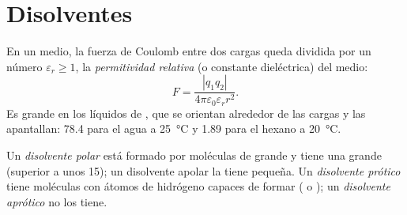 \section{Disolventes}

\begin{definition}\label{def:b1:intermolecular-forces-solvents:permittivity}
En un medio, la fuerza de Coulomb entre dos cargas queda dividida por un
número $\varepsilon_r \ge 1$, la \emph{permitividad relativa}
(o constante dieléctrica) del medio:
\[
  F = \frac{|q_1 q_2|}{4\pi\varepsilon_0\varepsilon_r r^2} .
\]
Es grande en los líquidos de , que se orientan alrededor
de las cargas y las apantallan: \num{78.4} para el agua a
\qty{25}{\celsius} y \num{1.89} para el hexano a \qty{20}{\celsius}.
\end{definition}

\begin{definition}\label{def:b1:intermolecular-forces-solvents:solvent-classes}
Un \emph{disolvente polar} está formado por
moléculas de  grande y tiene una 
grande (superior a unos 15); un disolvente apolar la tiene pequeña. Un
\emph{disolvente prótico} tiene moléculas con
átomos de hidrógeno capaces de formar  ( o
); un \emph{disolvente aprótico} no los
tiene.
\end{definition}

